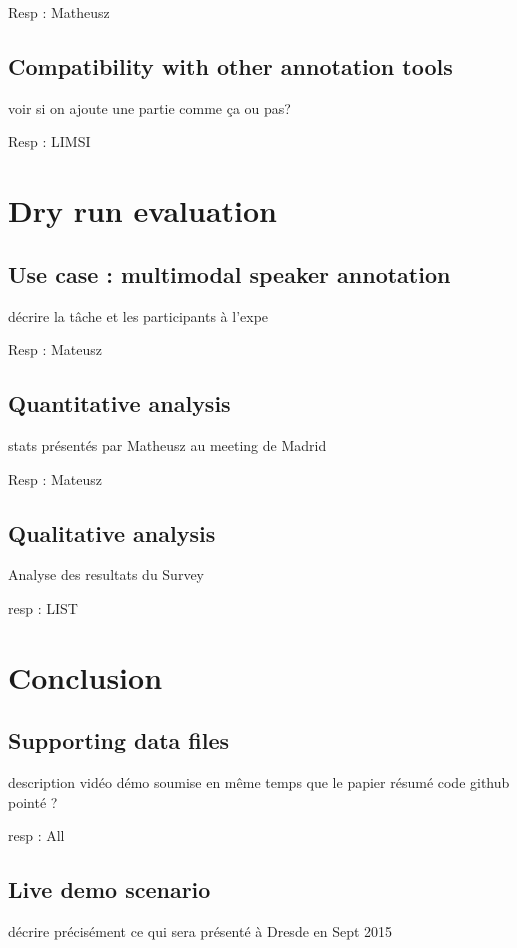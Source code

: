\documentclass[a4paper]{article}
\begin{document}
Resp : Matheusz

      \subsection{Compatibility with other annotation tools}
voir si on ajoute une partie comme ça ou pas?

Resp : LIMSI



  \section{Dry run evaluation}
      \subsection{Use case : multimodal speaker annotation}
     
décrire la tâche et les participants à l'expe

Resp : Mateusz
      
      \subsection{Quantitative analysis}
    
stats présentés par Matheusz au meeting de Madrid

Resp : Mateusz
  
     \subsection{Qualitative analysis}
    
Analyse des resultats du Survey

resp : LIST




  \section{Conclusion}
  
    \subsection{Supporting data files}

description vidéo démo soumise en même temps que le papier
résumé code github pointé ?    

resp : All

    \subsection{Live demo scenario}

décrire précisément ce qui sera présenté à Dresde en Sept 2015

  
  \newpage
  \eightpt
  
  
  
\end{document}
